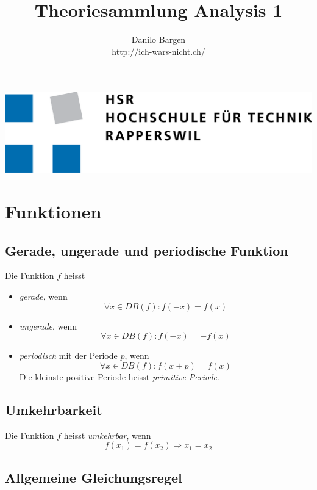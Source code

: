 \documentclass[10pt,a4paper]{article}
\author{Danilo Bargen\\http://ich-wars-nicht.ch/}
\title{Theoriesammlung Analysis 1}
\begin{document}
\begin{titlepage}
	\maketitle
	\vspace{120mm}
	\center\includegraphics{hsr_logo.png}
	\thispagestyle{empty} %
\end{titlepage}

\tableofcontents\newpage

\section{Funktionen}

\subsection{Gerade, ungerade und periodische Funktion}

Die Funktion $f$ heisst

\begin{itemize}
\item \textit{gerade}, wenn
$$\forall x \in DB(f): f(-x) = f(x)$$
\item \textit{ungerade}, wenn
$$\forall x \in DB(f): f(-x) = -f(x)$$
\item \textit{periodisch} mit der Periode $p$, wenn
$$\forall x \in DB(f): f(x + p) = f(x)$$
Die kleinste positive Periode heisst \textit{primitive Periode}.
\end{itemize}


\subsection{Umkehrbarkeit}

Die Funktion $f$ heisst \textit{umkehrbar}, wenn
$$f(x_1) = f(x_2) \Rightarrow x_1 = x_2$$

\subsection{Allgemeine Gleichungsregel}
\end{document}
